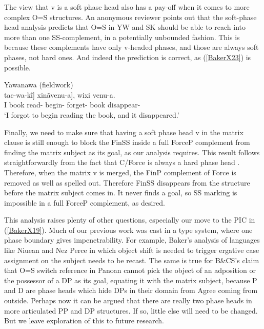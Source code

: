 \documentclass[output=paper]{langscibook}
\begin{document}
The view that v is a soft phase head also has a pay-off when it comes to more complex O=S structures. An anonymous reviewer points out that the soft-phase head analysis predicts that O=S in YW and SK should be able to reach into more than one SS-complement, in a potentially unbounded fashion. This is because these complements have only v-headed phases, and those are always soft phases, not hard ones. And indeed the prediction is correct, as (\ref{BakerX23}) is possible.

\begin{exe}
    \ex Yawanawa (fieldwork) \label{BakerX23}\\
			\gll [Ẽ [[wixi ane-kĩ] tae-wa-kĩ] xinãvenu-a], wixi venu-a.\\
			    I book read-\sc{ss} begin- forget- book disappear-\\
			\glt `I forgot to begin reading the book, and it disappeared.'
\end{exe}

Finally, we need to make sure that having a soft phase head v in the matrix clause is still enough to block the FinSS inside a full ForceP complement from finding the matrix subject as its goal, as our analysis requires. This result follows straightforwardly from the fact that C/Force is always a hard phase head \citep[149]{baker2015case}. Therefore, when the matrix v is merged, the FinP complement of Force is removed as well as spelled out. Therefore FinSS disappears from the structure before the matrix subject comes in. It never finds a goal, so SS marking is impossible in a full ForceP complement, as desired.

This analysis raises plenty of other questions, especially our move to the PIC in (\ref{BakerX19}). Much of our previous work was cast in a \citet{chomsky2000minimalist} type system, where one phase boundary gives impenetrability. For example, Baker’s \citeyearpar{chomsky2000minimalist} analysis of languages like Niuean and Nez Perce in which object shift is needed to trigger ergative case assignment on the subject needs to be recast. The same is true for B\&CS’s claim that O=S switch reference in Panoan cannot pick the object of an adposition or the possessor of a DP as its goal, equating it with the matrix subject, because P and D are phase heads which hide DPs in their domain from Agree coming from outside. Perhaps now it can be argued that there are really two phase heads in more articulated PP and DP structures. If so, little else will need to be changed. But we leave exploration of this to future research.
\end{document}
